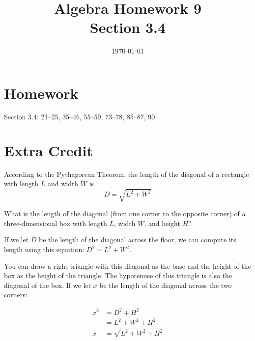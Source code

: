 \documentclass[letterpaper]{exam}
\title{Algebra Homework 9 \\ Section 3.4 }
\author{}
\date{\today}
\begin{document}
  \maketitle

  \section{Homework}

  Section 3.4: 21--25, 35--46, 55--59, 73--78, 85--87, 90 






  \section{Extra Credit}
  According to the Pythagorean Theorem, the length of the diagonal of a rectangle
  with length $L$ and width $W$ is 
  \[
    D = \sqrt{L^2 + W^2}
  \]  
  
  What is the length of the diagonal (from one corner to the opposite corner) of a three-dimensional
  box with length $L$, width $W$, and height $H$?

  \begin{solution}
    If we let $D$ be the length of the diagonal across the floor, we can compute its length using
    this equation: $D^2 = L^2 + W^2$.  

    You can draw a right triangle with this diagonal as the base and the height of the box as the
    height of the triangle.  The hypotenuse of this triangle is also the diagonal of the box.  If we
    let $x$ be the length of the diagonal across the two corners:

    \begin{align*}
      x^2 & = D^2 + H^2 \\
          & = L^2 + W^2 + H^2 \\
      x   & = \sqrt{ L^2 + W^2 + H^2 } \\
    \end{align*}

  \end{solution}
\end{document}
